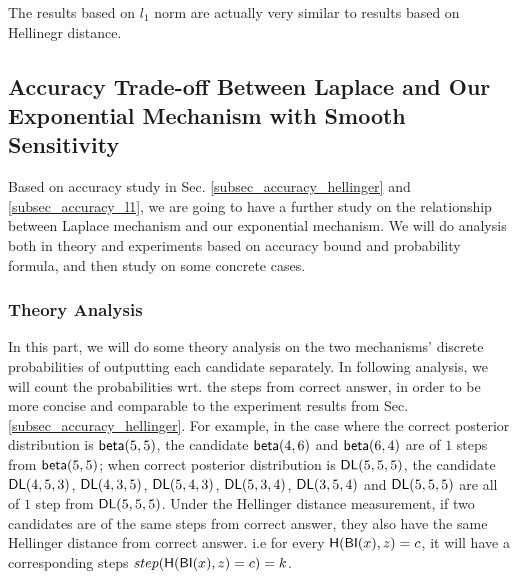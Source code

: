 The results based on $l_1$ norm are actually very similar to results based on Hellinegr distance.


\subsection{Accuracy Trade-off Between Laplace and Our Exponential Mechanism with Smooth Sensitivity}
\label{subsec_accuracy_tradeoff}
Based on accuracy study in Sec. \ref{subsec_accuracy_hellinger} and \ref{subsec_accuracy_l1}, we are going to have a further study on the relationship between Laplace mechanism and our exponential mechanism. We will do analysis both in theory and experiments based on accuracy bound and probability formula, and then study on some concrete cases.

\subsubsection{Theory Analysis}
In this part, we will do some theory analysis on the two mechanisms' discrete probabilities of outputting each candidate separately. In following analysis, we will count the probabilities wrt. the steps from correct answer, in order to be more concise and comparable to the experiment results from Sec. \ref{subsec_accuracy_hellinger}. For example, in the case where the correct posterior distribution is $\mathsf{beta}(5,5)$, the candidate $\mathsf{beta}(4,6)$ and $\mathsf{beta}(6,4)$ are of $1$ steps from $\mathsf{beta}(5,5)$; when correct posterior distribution is $\mathsf{DL}(5,5,5)$, the candidate $\mathsf{DL}(4,5,3)$, $\mathsf{DL}(4,3,5)$, $\mathsf{DL}(5,4,3)$, $\mathsf{DL}(5,3,4)$, $\mathsf{DL}(3,5,4)$ and $\mathsf{DL}(5,5,5)$ are all of $1$ step from $\mathsf{DL}(5,5,5)$. Under the Hellinger distance measurement, if two candidates are of the same steps from correct answer, they also have the same Hellinger distance from correct answer. i.e for every $\mathsf{H}(\mathsf{BI}(x), z) = c$, it will have a corresponding steps $step(\mathsf{H}(\mathsf{BI}(x), z) = c) = k$.


